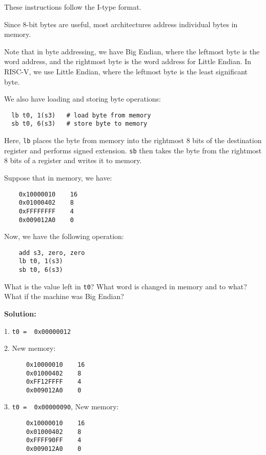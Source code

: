 These instructions follow the I-type format.

Since 8-bit bytes are useful, most architectures address individual bytes in memory.

Note that in byte addressing, we have Big Endian, where the leftmost byte is the word address, and the rightmost byte is the word address for Little Endian. In RISC-V, we use Little Endian, where the leftmost byte is the least significant byte.

We also have loading and storing byte operations: 
\begin{verbatim}
  lb t0, 1(s3)   # load byte from memory
  sb t0, 6(s3)   # store byte to memory
\end{verbatim}
Here, \verb|lb| places the byte from memory into the rightmost 8 bits of the destination register and performs signed extension. \verb|sb| then takes the byte from the rightmost 8 bits of a register and writes it to memory.

\begin{eg}
  Suppose that in memory, we have:
  \begin{verbatim}
    0x10000010    16
    0x01000402    8
    0xFFFFFFFF    4
    0x009012A0    0
  \end{verbatim}

  Now, we have the following operation:

  \begin{verbatim}
    add s3, zero, zero
    lb t0, 1(s3)
    sb t0, 6(s3)
  \end{verbatim}
  
  What is the value left in \verb|t0|? What word is changed in memory and to what? What if the machine was Big Endian? 

  \textbf{Solution:} 

  1. \verb|t0 =  0x00000012|
  
  2. New memory:
    \begin{verbatim}
      0x10000010    16
      0x01000402    8
      0xFF12FFFF    4
      0x009012A0    0
    \end{verbatim}

  3. \verb|t0 =  0x00000090|, New memory:
    \begin{verbatim}
      0x10000010    16
      0x01000402    8
      0xFFFF90FF    4
      0x009012A0    0
    \end{verbatim}
\end{eg}